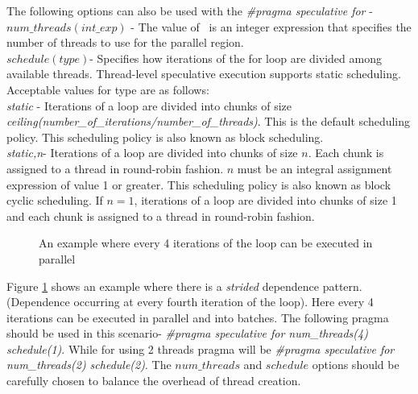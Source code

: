 \documentclass[10pt]{report}          %
\begin{document}
The following options can also be used with the \textit{\#pragma speculative for} - \\

$num\_threads (int\_exp)$ - The value of \ is an integer expression that specifies the number of
threads to use for the parallel region.\\

$schedule (type)$- Specifies how iterations of the for loop are divided among available threads.
Thread-level speculative execution supports static scheduling. Acceptable
values for type are as follows:\\

\textit{static} - Iterations of a loop are divided into chunks of size
\textit{ceiling(number\_of\_iterations/number\_of\_threads)}. This is the default scheduling policy. This scheduling policy is also known as block scheduling.\\

\textit{static,n}- Iterations of a loop are divided into chunks of size $n$. Each chunk is
assigned to a thread in round-robin fashion. $n$ must be an integral assignment expression of value 1 or greater. This scheduling policy is also known as block cyclic scheduling. If $n=1$, iterations of a loop are divided into chunks of size 1 and each chunk is assigned to a thread in round-robin fashion. \\

\begin{figure}[h]
\begin{center}
\caption{An example where every 4 iterations of the loop can be executed in parallel}
\end{center}
\label{fig:indep_window}
\end{figure}


Figure \ref{fig:indep_window} shows an example where there is a \textit{strided} dependence pattern. (Dependence occurring at every fourth iteration of the loop).  Here every 4 iterations can be executed in parallel and into batches. The following pragma should be used in this scenario- \textit{\#pragma speculative for num\_threads(4) schedule(1)}.  While for using 2 threads pragma will be \textit{\#pragma speculative for num\_threads(2) schedule(2)}.  The $num\_threads$ and $schedule$ options should be carefully chosen to balance the overhead of thread creation.
\end{document}
